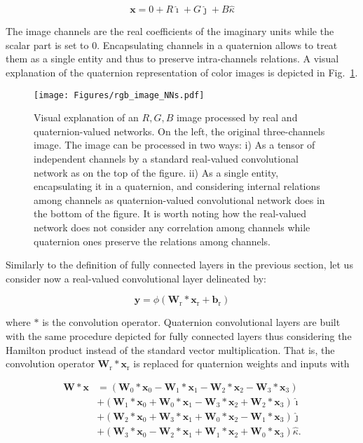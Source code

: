 \documentclass[graybox]{svmult}
\def\x{{\mathbf x}}														\def\q{{\mathbf q}}														\def\y{{\mathbf y}}														\def\z{{\mathbf z}}														\def\C{{\mathbf C}}														\def\E{\text{E}} 									\def\W{{\mathbf W}}														\def\ii{{\hat{\imath}}}												\def\ij{{\hat{\jmath}}}												\def\ik{{\hat{\kappa}}}												\def\bH{\mathbb{H}}														\def\bQ{\mathbb{Q}}														\def\bR{\mathbb{R}}														\def\cD{{\cal D}}															\def\cL{{\cal L}}															\def\cN{{\cal N}}															\newcommand{\beps}{\boldsymbol{\epsilon}}					  \newcommand{\bmu}{\boldsymbol{\mu}}					  \newcommand{\bphi}{\boldsymbol{\phi}}				  \newcommand{\bth}{\boldsymbol{\theta}}				\newcommand{\bsigma}{\boldsymbol{\sigma}} 		\newcommand{\bSigma}{\boldsymbol{\Sigma}} 		\newcommand{\tT}{^{\text{T}}} 								\newcommand{\tH}{^{\text{H}}} 								\DeclareMathOperator{\diag}{diag} 									\DeclareMathOperator{\Tr}{Tr}								\DeclareMathOperator{\var}{var}
\begin{document}
\begin{equation}
    \x = 0 + R\ii + G\ij + B\ik
\label{eq:qimg}
\end{equation}

\noindent The image channels are the real coefficients of the imaginary units while the scalar part is set to $0$. Encapsulating channels in a quaternion allows to treat them as a single entity and thus to preserve intra-channels relations. A visual explanation of the quaternion representation of color images is depicted in Fig.~\ref{fig:rgb_images}.

\begin{figure}
\centering
    \texttt{[image: Figures/rgb\_image\_NNs.pdf]}
\caption{Visual explanation of an $R,G,B$ image processed by real and quaternion-valued networks. On the left, the original three-channels image. The image can be processed in two ways: i) As a tensor of independent channels by a standard real-valued convolutional network as on the top of the figure. ii) As a single entity, encapsulating it in a quaternion, and considering internal relations among channels as quaternion-valued convolutional network does in the bottom of the figure. It is worth noting how the real-valued network does not consider any correlation among channels while quaternion ones preserve the relations among channels.}
    \label{fig:rgb_images}
\end{figure}

Similarly to the definition of fully connected layers in the previous section, let us consider now a real-valued convolutional layer delineated by:

\begin{equation}
\label{eq:conv_layer}
    \mathbf{y} = \phi(\mathbf{W}_{\text{r}} * \mathbf{x}_{\text{r}} + \mathbf{b}_{\text{r}})
\end{equation}

\noindent where $*$ is the convolution operator.
Quaternion convolutional layers are built with the same procedure depicted for fully connected layers thus considering the Hamilton product instead of the standard vector multiplication. That is, the convolution operator $\mathbf{W}_{\text{r}} * \mathbf{x}_{\text{r}}$ is replaced for quaternion weights and inputs with

\begin{equation}
	\begin{split}
	\W * \x &= \left(\W_{0}*\x_{0} - \W_{1}*\x_{1} - \W_{2}*\x_{2} - \W_{3}*\x_{3}\right)\\
	&+ \left(\W_{1}*\x_{0} + \W_{0}*\x_{1} - \W_{3}*\x_{2} + \W_{2}*\x_{3}\right)\ii \\
	&+ \left(\W_{2}*\x_{0} + \W_{3}*\x_{1} + \W_{0}*\x_{2} - \W_{1}*\x_{3}\right)\ij \\
	&+ \left(\W_{3}*\x_{0} - \W_{2}*\x_{1} + \W_{1}*\x_{2} + \W_{0}*\x_{3}\right)\ik. \\
    \end{split}
\label{eq:qconv}
\end{equation}
\end{document}
